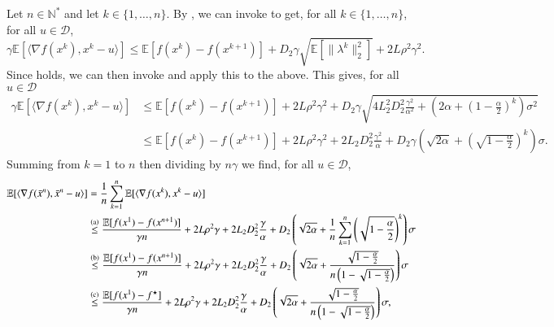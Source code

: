 \begin{appendixproof}
    Let $n\in\mathbb{N}^*$ and let $k\in\{1,\ldots,n\}$.
    By , we can invoke  to get, for all $k\in\{1,\ldots,n\}$, for all $u\in\mathcal{D}$,
    \begin{equation*}
        \gamma \mathbb{E}[\langle \nabla f(x^k), x^k-u\rangle]
            \leq \mathbb{E}[f(x^k) - f(x^{k+1})] + D_2\gamma \sqrt{\mathbb{E}[\| \lambda^k\|_2^2]} + 2L\rho^2\gamma^2.
    \end{equation*}
    Since  holds, we can then invoke  and apply this to the above. This gives, for all $u\in\mathcal{D}$
    \begin{equation*}
        \begin{aligned}
            \gamma\mathbb{E}[\langle \nabla f(x^k),x^k-u\rangle]
                &\leq \mathbb{E}[f(x^k) - f(x^{k+1})] + 2L\rho^2\gamma^2 + D_2\gamma \sqrt{4L_2^2D_2^2\frac{\gamma^2}{\alpha^2} + \left(2\alpha + \left(1-\frac{\alpha}{2}\right)^k\right)\sigma^2}\\
                &\leq \mathbb{E}[f(x^k) - f(x^{k+1})] + 2L\rho^2\gamma^2 + 2L_2D_2^2\frac{\gamma^2}{\alpha} + D_2\gamma \left(\sqrt{2\alpha} + \left(\sqrt{1-\frac{\alpha}{2}}\right)^k\right)\sigma.
        \end{aligned}
    \end{equation*}
    Summing from $k=1$ to $n$ then dividing by $n\gamma$ we find, for all $u\in\mathcal{D}$,
    \begin{equation}\label{eq:SCGfinalineq}
        \begin{aligned}
            \mathbb{E}[\langle \nabla f(\bar{x}^n), \bar{x}^n-u\rangle]
                &=\frac{1}{n}\sum\limits_{k=1}^n\mathbb{E}[\langle \nabla f(x^k),x^k-u\rangle]\\
                &\stackrel{\text{(a)}}{\leq} \frac{\mathbb{E}[f(x^1) - f(x^{n+1})]}{\gamma n} + 2L\rho^2\gamma + 2L_2D_2^2\frac{\gamma}{\alpha} + D_2 \left(\sqrt{2\alpha} + \frac{1}{n}\sum\limits_{k=1}^n\left(\sqrt{1-\frac{\alpha}{2}}\right)^k\right)\sigma\\
                &\stackrel{\text{(b)}}{\leq} \frac{\mathbb{E}[f(x^1) - f(x^{n+1})]}{\gamma n} + 2L\rho^2\gamma + 2L_2D_2^2\frac{\gamma}{\alpha} + D_2 \left(\sqrt{2\alpha} + \frac{\sqrt{1-\frac{\alpha}{2}}}{n\left(1-\sqrt{1-\frac{\alpha}{2}}\right)}\right)\sigma\\
                &\stackrel{\text{(c)}}{\leq} \frac{\mathbb{E}[f(x^1) - \fmin]}{\gamma n} + 2L\rho^2\gamma + 2L_2D_2^2\frac{\gamma}{\alpha} + D_2 \left(\sqrt{2\alpha} + \frac{\sqrt{1-\frac{\alpha}{2}}}{n\left(1-\sqrt{1-\frac{\alpha}{2}}\right)}\right)\sigma,

\end{aligned}
\end{equation}
\end{appendixproof}
